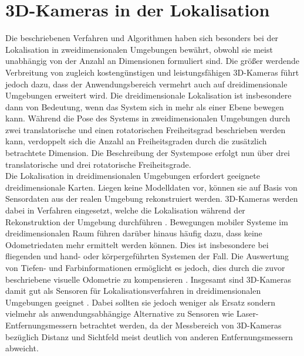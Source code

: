 
\prever{
}

\prever{
}
\section{3D-Kameras in der Lokalisation}
Die beschriebenen Verfahren und Algorithmen haben sich besonders bei der Lokalisation in zweidimensionalen Umgebungen bewährt, obwohl sie meist unabhängig von der Anzahl an Dimensionen formuliert sind. Die größer werdende Verbreitung von zugleich kostengünstigen und leistungsfähigen 3D-Kameras führt jedoch dazu, dass der Anwendungsbereich vermehrt auch auf dreidimensionale Umgebungen erweitert wird. Die dreidimensionale Lokalisation ist insbesondere dann von Bedeutung, wenn das System sich in mehr als einer Ebene bewegen kann. Während die Pose des Systems in zweidimensionalen Umgebungen durch zwei translatorische und einen rotatorischen Freiheitsgrad beschrieben werden kann, verdoppelt sich die Anzahl an Freiheitsgraden durch die zusätzlich betrachtete Dimension. Die Beschreibung der Systempose erfolgt nun über drei translatorische und drei rotatorische Freiheitsgrade.\\

Die Lokalisation in dreidimensionalen Umgebungen erfordert geeignete dreidimensionale Karten. Liegen keine Modelldaten vor, können sie auf Basis von Sensordaten aus der realen Umgebung rekonstruiert werden. 3D-Kameras werden dabei in Verfahren eingesetzt, welche die Lokalisation während der Rekonstruktion der Umgebung durchführen \cite{Durrant2006}. Bewegungen mobiler Systeme im dreidimensionalen Raum führen darüber hinaus häufig dazu, dass keine Odometriedaten mehr ermittelt werden können. Dies ist insbesondere bei fliegenden \cite{Huang2011} und hand- oder körpergeführten Systemen \cite{Fallon2012} der Fall. Die Auswertung von Tiefen- und Farbinformationen ermöglicht es jedoch, dies durch die zuvor beschriebene visuelle Odometrie zu kompensieren \cite{Whelan2013robust}. Insgesamt sind 3D-Kameras damit gut als Sensoren für Lokalisationsverfahren in dreidimensionalen Umgebungen geeignet \cite{Cunha2011} \cite{Eriksson2012}. Dabei sollten sie jedoch weniger als Ersatz sondern vielmehr als anwendungsabhängige Alternative zu Sensoren wie Laser-Entfernungsmessern betrachtet werden, da der Messbereich von 3D-Kameras bezüglich Distanz und Sichtfeld meist deutlich von anderen Entfernungsmessern abweicht.

